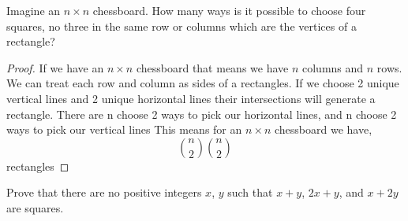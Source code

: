 \documentclass[11pt]{article}
\newenvironment{problem}[2][Problem\!]{\begin{trivlist}
\item[\hskip \labelsep {\bfseries #1}\hskip \labelsep {\bfseries #2}]}{\end{trivlist}}
\begin{document}
\begin{tcolorbox}
    \begin{problem} {OC | 11/01 | 68}
        Imagine an $n \times n$ chessboard. How many ways is it possible to choose four squares, no three in the same row or columns which are the vertices of a rectangle?
    \end{problem}
\end{tcolorbox}
\begin{proof}
    If we have an $n\times n$ chessboard that means we have $n$ columns and $n$ rows. We can treat each row and column as sides of a rectangles. If we choose 2 unique vertical lines and 2 unique horizontal lines their intersections will generate a rectangle. There are n choose 2 ways to pick our horizontal lines, and n choose 2 ways to pick our vertical lines This means for an $n \times n$ chessboard we have, 
    \[\binom{n}{2}\binom{n}{2}\]
    rectangles

\end{proof}
\newpage
\begin{tcolorbox}
    \begin{problem} {OC | 11/10 | 86.}
        Prove that there are no positive integers $x$, $y$ such that $x+y$, $2x + y$, and $x + 2y$ are squares. 
    \end{problem}
\end{tcolorbox}
\end{document}
